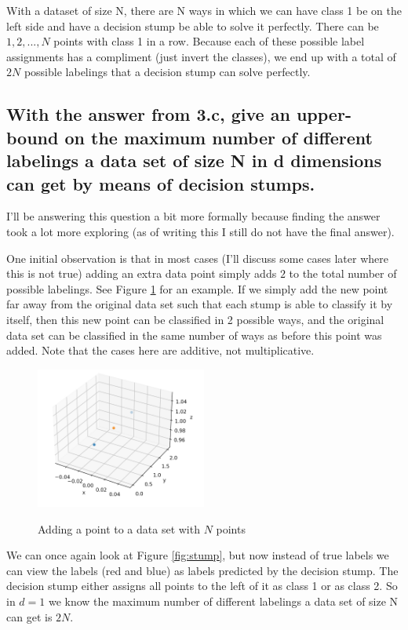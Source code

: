 \documentclass[11pt,a4paper]{article}
\begin{document}
With a dataset of size N, there are N ways in which we can have class 1 be on the left side and have a decision stump be able to solve it perfectly. There can be $1, 2, ..., N$ points with class 1 in a row.
Because each of these possible label assignments has a compliment (just invert the classes), we end up with a total of $2N$ possible labelings that a decision stump can solve perfectly.


\subsection{With the answer from 3.c, give an upper-bound on the maximum number of different
labelings a data set of size N in d dimensions can get by means of decision stumps.}
\label{sec:2d}

I'll be answering this question a bit more formally because finding the answer took a lot more exploring (as of writing this I still do not have the final answer).

One initial observation is that in most cases (I'll discuss some cases later where this is not true) adding an extra data point simply adds $2$ to the total number of possible labelings. See Figure \ref{fig:adding-point} for an example. If we simply add the new point far away from the original data set such that each stump is able to classify it by itself, then this new point can be classified in 2 possible ways, and the original data set can be classified in the same number of ways as before this point was added. Note that the cases here are additive, not multiplicative.

\begin{figure}[h]
    \caption{Adding a point to a data set with $N$ points}
    \centering
    \includegraphics[width=0.5\textwidth]{stump-3D.png}
    \label{fig:adding-point}
\end{figure}

We can once again look at Figure \ref{fig:stump}, but now instead of true labels we can view the labels (red and blue) as labels predicted by the decision stump. The decision stump either assigns all points to the left of it as class 1 or as class 2. So in $d=1$ we know the maximum number of different labelings a data set of size N can get is $2N$. 
\end{document}
